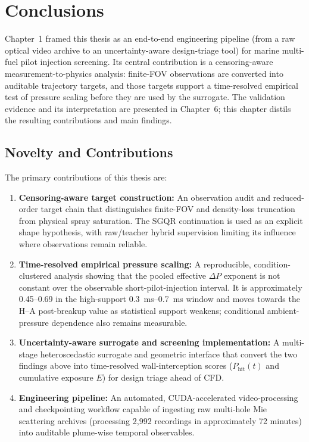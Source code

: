 \section{Conclusions}

Chapter~1 framed this thesis as an end-to-end engineering pipeline (from a raw optical video archive to an uncertainty-aware design-triage tool) for marine multi-fuel pilot injection screening. Its central contribution is a censoring-aware measurement-to-physics analysis: finite-FOV observations are converted into auditable trajectory targets, and those targets support a time-resolved empirical test of pressure scaling before they are used by the surrogate. The validation evidence and its interpretation are presented in Chapter~6; this chapter distils the resulting contributions and main findings.

\subsection{Novelty and Contributions}

The primary contributions of this thesis are:

\begin{enumerate}
  \item \textbf{Censoring-aware target construction:} An observation audit and reduced-order target chain that distinguishes finite-FOV and density-loss truncation from physical spray saturation. The SGQR continuation is used as an explicit shape hypothesis, with raw/teacher hybrid supervision limiting its influence where observations remain reliable.
  \item \textbf{Time-resolved empirical pressure scaling:} A reproducible, condition-clustered analysis showing that the pooled effective \(\Delta P\) exponent is not constant over the observable short-pilot-injection interval. It is approximately 0.45--0.69 in the high-support \SIrange{0.3}{0.7}{ms} window and moves towards the H--A post-breakup value as statistical support weakens; conditional ambient-pressure dependence also remains measurable.
  \item \textbf{Uncertainty-aware surrogate and screening implementation:} A multi-stage heteroscedastic surrogate and geometric interface that convert the two findings above into time-resolved wall-interception scores ($P_{\mathrm{hit}}(t)$ and cumulative exposure \(E\)) for design triage ahead of CFD.
  \item \textbf{Engineering pipeline:} An automated, CUDA-accelerated video-processing and checkpointing workflow capable of ingesting raw multi-hole Mie scattering archives (processing 2{,}992 recordings in approximately 72 minutes) into auditable plume-wise temporal observables.
\end{enumerate}

